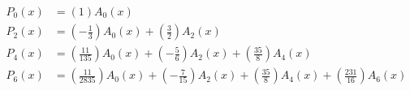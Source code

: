 \begin{align*}
P_{0}(x)&=\left(1\right)A_{0}(x)\\
P_{2}(x)&=\left(- \frac{1}{3}\right)A_{0}(x)+\left(\frac{3}{2}\right)A_{2}(x)\\
P_{4}(x)&=\left(\frac{11}{135}\right)A_{0}(x)+\left(- \frac{5}{6}\right)A_{2}(x)+\left(\frac{35}{8}\right)A_{4}(x)\\
P_{6}(x)&=\left(\frac{11}{2835}\right)A_{0}(x)+\left(- \frac{7}{15}\right)A_{2}(x)+\left(\frac{35}{8}\right)A_{4}(x)+\left(\frac{231}{16}\right)A_{6}(x)
\end{align*}
